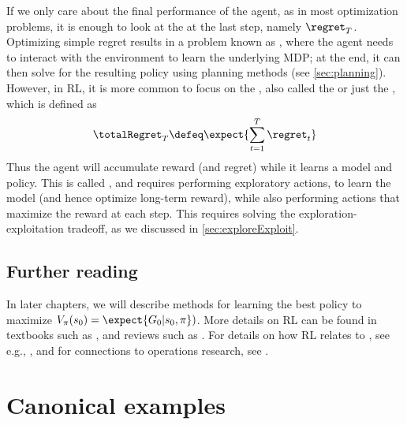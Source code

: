 If we only care about the final
performance of the agent,
as in most optimization problems,
it is enough to look at the 
at the last step, namely $\regret_T$.
Optimizing simple regret results in a problem
known as  
\citep{Bubeck2011},
where the agent needs to interact with the environment
to learn the underlying MDP;
at the end, it can then solve for the resulting policy
using planning methods
(see \cref{sec:planning}).
However, in RL, it is more common to focus
on 
the ,
also called the
 or just the ,
which is defined as
\begin{align}
\totalRegret_T \defeq \expect{\sum_{t=1}^T \regret_t}
\end{align}
Thus the agent will accumulate reward (and regret)
while it learns a model and policy.
This is called ,
and requires  performing exploratory actions,
to learn the model (and hence optimize long-term reward), while also
performing actions that maximize the reward at each step.
This requires solving the exploration-exploitation
tradeoff, as we discussed in \cref{sec:exploreExploit}.


\subsection{Further reading}

In later chapters, we will describe methods for learning the best
policy to maximize $V_{\pi}(s_0)=\expect{G_0|s_0,\pi})$.
More details on RL can be found
in textbooks such as 
\citep{Szepesvari10,Suttonv2,AgarwalBook,Plaat2022,Ivanov2019,RaoRLBook,Li2023RL,MannorBook},
and reviews such as \citep{Arulkumaran2017,FrancoisLavet2018,Li2018RL,weng2018bandit}.
For details on how RL relates to ,
see e.g., \citep{Sontag98,Recht2019,BertsekasRL,Meyn2022},
and for connections to operations research,
see \citep{Powell2022}.


\section{Canonical examples}

